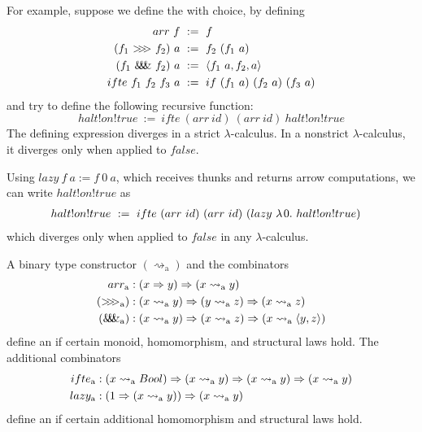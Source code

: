 \documentclass[preprint]{sigplanconf}
\newcommand{\arrow}{\rightsquigarrow}
\newcommand{\arrowarr}{\ensuremath{arr}}
\newcommand{\arrowcomp}{\ensuremath{{>}\mspace{-6mu}{>}\mspace{-6mu}{>}}}
\newcommand{\arrowpair}{\ensuremath{\mathit{\&\mspace{-7.5mu}\&\mspace{-7.5mu}\&}}}
\newcommand{\arrowif}{\ensuremath{ifte}}
\newcommand{\arrowlazy}{\ensuremath{lazy}}
\newcommand{\gen}{_\mathrm{a}}
\begin{document}
For example, suppose we define the  with choice, by defining
\begin{equation}
\begin{aligned}
	\arrowarr~f &\ := \ f \\
	(f_1~\arrowcomp~f_2)~a &\ := \ f_2~(f_1~a) \\
	(f_1~\arrowpair~f_2)~a &\ := \ \pair{f_1~a,f_2,a} \\
	\arrowif~f_1~f_2~f_3~a &\ := \ if~(f_1~a)~(f_2~a)~(f_3~a) \\
\end{aligned}
\label{eqn:function-arrow}
\end{equation}
and try to define the following recursive function:
\begin{equation}
	halt!on!true \ := \ \arrowif~(\arrowarr~id)~(\arrowarr~id)~halt!on!true
\end{equation}
The defining expression diverges in a strict $\lambda$-calculus.
In a nonstrict $\lambda$-calculus, it diverges only when applied to $false$.

Using $\arrowlazy~f~a := f~0~a$, which receives thunks and returns arrow computations, we can write $halt!on!true$ as
\begin{equation}
\begin{aligned}
	&halt!on!true \ := \ 
	\arrowif~(\arrowarr~id)~(\arrowarr~id)~(\arrowlazy~\fun{0}{halt!on!true})
\end{aligned}
\end{equation}
which diverges only when applied to $false$ in any $\lambda$-calculus.

\begin{definition}[arrow with choice]A binary type constructor $(\arrow\gen)$ and the combinators
\begin{equation}
\begin{aligned}
	\arrowarr\gen &: (x \tto y) \tto (x \arrow\gen y)
\\
	(\arrowcomp\gen) &: (x \arrow\gen y) \tto (y \arrow\gen z) \tto (x \arrow\gen z)
\\
	(\arrowpair\gen) &: (x \arrow\gen y) \tto (x \arrow\gen z) \tto (x \arrow\gen \pair{y,z})
\end{aligned}
\label{eqn:arrow-combinators}
\end{equation}
define an  if certain monoid, homomorphism, and structural laws hold.
The additional combinators
\begin{equation}
\begin{aligned}
	\arrowif\gen &: (x \arrow\gen Bool) \tto (x \arrow\gen y) \tto (x \arrow\gen y) \tto (x \arrow\gen y)
\\
	\arrowlazy\gen &: (1 \tto (x \arrow\gen y)) \tto (x \arrow\gen y)
\end{aligned}
\end{equation}
define an  if certain additional homomorphism and structural laws hold.
\end{definition}
\end{document}
